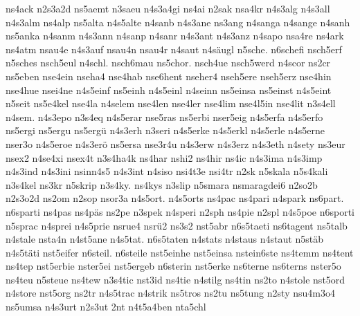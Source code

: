 {    ns4ack
    n2s3a2d
    ns5aemt
    n3saeu
    n4s3a4gi
    ns4ai
    n2sak
    nsa4kr
    n4s3alg
    n4s3all
    n4s3alm
    ns4alp
    ns5alta
    n4s5alte
    n4sanb
    n4s3ane
    ns3ang
    n4sanga
    n4sange
    n4sanh
    ns5anka
    n4sanm
    n4s3ann
    n4sanp
    n4sanr
    n4s3ant
    n4s3anz
    n4sapo
    nsa4re
    ns4ark
    ns4atm
    nsau4e
    n4s3auf
    nsau4n
    nsau4r
    n4saut
    n4säugl
    n5sche.
    n6schefi
    nsch5erf
    n5sches
    nsch5eul
    n4schl.
    nsch6mau
    ns5chor.
    nsch4ue
    nsch5werd
    n4scor
    ns2cr
    ns5eben
    nse4ein
    nseha4
    nse4hab
    nse6hent
    nseher4
    nseh5ere
    nseh5erz
    nse4hin
    nse4hue
    nsei4ne
    n4s5einf
    ns5einh
    n4s5einl
    n4seinn
    ns5einsa
    ns5einst
    n4s5eint
    n5seit
    ns5e4kel
    nse4la
    n4selem
    nse4len
    nse4ler
    nse4lim
    nse4l5in
    nse4lit
    n3s4ell
    n4sem.
    n4s3epo
    n3s4eq
    n4s5erar
    nse5ras
    ns5erbi
    nser5eig
    n4s5erfa
    n4s5erfo
    ns5ergi
    ns5ergu
    ns5ergü
    n4s3erh
    n3seri
    n4s5erke
    n4s5erkl
    n4s5erle
    n4s5erne
    nser3o
    n4s5eroe
    n4s3erö
    ns5ersa
    nse3r4u
    n4s3erw
    n4s3erz
    n4s3eth
    n4sety
    ns3eur
    nsex2
    n4se4xi
    nsex4t
    n3s4ha4k
    ns4har
    nshi2
    ns4hir
    ns4ic
    n4s3ima
    n4s3imp
    n4s3ind
    n4s3ini
    nsinn4s5
    n4s3int
    n4siso
    nsi4t3e
    nsi4tr
    n2sk
    n5skala
    n5s4kali
    n3s4kel
    ns3kr
    n5skrip
    n3s4ky.
    ns4kys
    n3slip
    n5smara
    nsmaragdei6
    n2so2b
    n2s3o2d
    ns2om
    n2sop
    nsor3a
    n4s5ort.
    n4s5orts
    ns4pac
    ns4pari
    n4spark
    ns6part.
    n6sparti
    ns4pas
    ns4päs
    ns2pe
    n3spek
    n4speri
    n2sph
    ns4pie
    n2spl
    n4s5poe
    n6sporti
    n5sprac
    n4sprei
    n4s5prie
    nsrue4
    nsrü2
    ns3s2
    nst5abr
    n6s5taeti
    ns6tagent
    ns5talb
    n4stale
    nsta4n
    n4st5ane
    n4s5tat.
    n6s5taten
    n4stats
    n4staus
    n4staut
    n5stäb
    n4s5täti
    nst5eifer
    n6steil.
    n6steile
    nst5einhe
    nst5einsa
    nstein6ste
    ns4temm
    ns4tent
    ns4tep
    nst5erbie
    nster5ei
    nst5ergeb
    n6sterin
    nst5erke
    ns6terne
    ns6terns
    nster5o
    ns4teu
    n5steue
    ns4tew
    n3s4tic
    nst3id
    ns4tie
    n4stilg
    ns4tin
    ns2to
    n4stole
    nst5ord
    n4store
    nst5org
    ns2tr
    n4s5trac
    n4strik
    ns5tros
    ns2tu
    ns5tung
    n2sty
    nsu4m3o4
    ns5umsa
    n4s3urt
    n2s3ut
    2nt
    n4t5a4ben
    nta5chl
}
